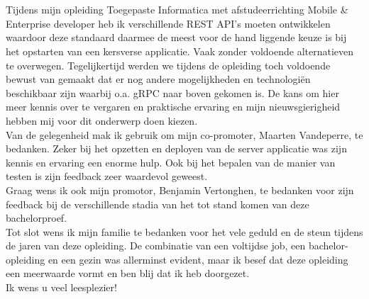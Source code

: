 
\chapter*{}%
\label{ch:voorwoord}

Tijdens mijn opleiding Toegepaste Informatica met afstudeerrichting Mobile \& Enterprise developer heb ik verschillende REST API's moeten ontwikkelen
waardoor deze standaard daarmee de meest voor de hand liggende keuze is bij het opstarten van een kersverse applicatie. Vaak zonder voldoende alternatieven te overwegen.
Tegelijkertijd werden we tijdens de opleiding toch voldoende bewust van gemaakt dat er nog andere mogelijkheden en technologi\"en beschikbaar zijn waarbij o.a. gRPC naar boven gekomen is.
De kans om hier meer kennis over te vergaren en praktische ervaring en mijn nieuwsgierigheid hebben mij voor dit onderwerp doen kiezen.\\

Van de gelegenheid mak ik gebruik om mijn co-promoter, Maarten Vandeperre, te bedanken. Zeker bij het opzetten en deployen van de server applicatie was
zijn kennis en ervaring een enorme hulp. Ook bij het bepalen van de manier van testen is zijn feedback zeer waardevol geweest.\\

Graag wens ik ook mijn promotor, Benjamin Vertonghen, te bedanken voor zijn feedback bij de verschillende stadia van het tot stand komen van deze bachelorproef.\\

Tot slot wens ik mijn familie te bedanken voor het vele geduld en de steun tijdens de jaren van deze opleiding. De combinatie van een voltijdse job, een bachelor-opleiding en
een gezin was allerminst evident, maar ik besef dat deze opleiding een meerwaarde vormt en ben blij dat ik heb doorgezet.\\

Ik wens u veel leesplezier!